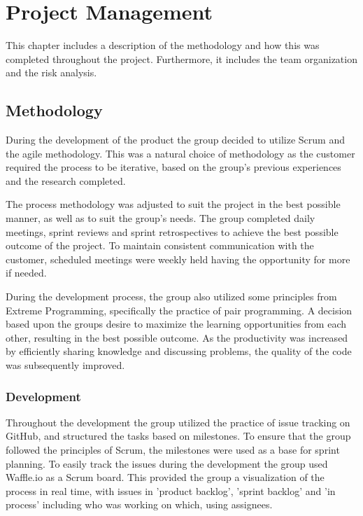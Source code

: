 
\chapter{Project Management}
This chapter includes a description of the methodology and how this was completed throughout the project. Furthermore, it includes the team organization and the risk analysis.

\section{Methodology}
\label{methodology}
During the development of the product the group decided to utilize Scrum and the agile methodology. This was a natural choice of methodology as the customer required the process to be iterative, based on the group's previous experiences and the research completed. 

The process methodology was adjusted to suit the project in the best possible manner, as well as to suit the group's needs. The group completed daily meetings, sprint reviews and sprint retrospectives to achieve the best possible outcome of the project. To maintain consistent communication with the customer, scheduled meetings were weekly held having the opportunity for more if needed. 

During the development process, the group also utilized some principles from Extreme Programming, specifically the practice of pair programming. A decision based upon the groups desire to maximize the learning opportunities from each other, resulting in the best possible outcome. As the productivity was increased by efficiently sharing knowledge and discussing problems, the quality of the code was subsequently improved.  

\subsection{Development}
Throughout the development the group utilized the practice of issue tracking on GitHub, and structured the tasks based on milestones. To ensure that the group followed the principles of Scrum, the milestones were used as a base for sprint planning. To easily track the issues during the development the group used Waffle.io as a Scrum board. This provided the group a visualization of the process in real time, with issues in 'product backlog', 'sprint backlog' and 'in process' including who was working on which, using assignees. 

